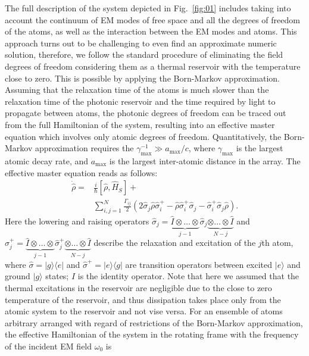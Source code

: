 \documentclass[aps,prl,twocolumn,superscriptaddress,showpacs,amsmath,amssymb]{revtex4-2}
\begin{document}
The full description of the system depicted in Fig.~\ref{fig:01} includes taking into account the continuum of EM modes of free space and all the degrees of freedom of the atoms, as well as the interaction between the EM modes and atoms. 
This approach turns out to be challenging to even find an approximate numeric solution, therefore, we follow the standard procedure \cite{carmichael1999statistical,bettles_quantum_2020,wild_algorithms_nodate} of eliminating the field degrees of freedom considering them as a thermal reservoir with the temperature close to zero.
This is possible by applying the Born-Markov approximation. 
Assuming that the relaxation time of the atoms is much slower than the relaxation time of the photonic reservoir and the time required by light to propagate between atoms, the photonic degrees of freedom can be traced out from the full Hamiltonian of the system, resulting into an effective master
equation which involves only atomic degrees of freedom.
Quantitatively, the Born-Markov approximation requires the $\gamma_{\mathrm{max}}^{-1} \gg a_\mathrm{max} / c$, where $\gamma_\mathrm{max}$ is the largest atomic decay rate, and $a_\mathrm{max}$ is the largest inter-atomic distance in the array.
The effective master equation reads as follows:
\begin{align} \label{eq:01}
    \dot{\hat{\rho}} =& \frac{i}{\hbar}\left[ \hat{\rho}, \hat{H}_S \right] + \nonumber \\
                      & \sum_{i,j=1}^N \frac{\Gamma_{ij}}{2}\left( 2 \hat{\sigma}_j \hat{\rho} \hat{\sigma}^+_i - \hat{\rho} \hat{\sigma}^+_i \hat{\sigma}_j - \hat{\sigma}^+_i \hat{\sigma}_j \hat{\rho}\right).
\end{align}
Here the lowering and raising operators $\hat{\sigma}_j = \underbrace{\hat{I} \otimes \ldots \otimes}_{j-1} \hat{\sigma}_j \underbrace{\otimes \ldots \otimes \hat{I}}_{N-j} $ and $\hat{\sigma}_j^+ = \underbrace{\hat{I} \otimes \ldots \otimes}_{j-1} \hat{\sigma}_j^+ \underbrace{\otimes \ldots \otimes
\hat{I}}_{N-j}$ describe the relaxation and excitation of the $j$th atom, where $\hat{\sigma} = |g\rangle \langle e|$ and $\hat{\sigma}^+ = |e\rangle \langle g|$ are transition operators between excited $|e\rangle$ and ground $|g\rangle$ states; $\hat{I}$ is the identity operator.
Note that here we assumed that the thermal excitations in the reservoir are negligible due to the close to zero temperature of the reservoir, and thus dissipation takes place only from the atomic system to the reservoir and not vise versa.
For an ensemble of atoms arbitrary arranged with regard of restrictions of the Born-Markov approximation, the effective Hamiltonian of the system in the rotating frame with the frequency of the incident EM field $\omega_0$ is \cite{bettles_quantum_2020,asenjo-garcia_exponential_2017,shahmoon_cooperative_2017}
\end{document}
